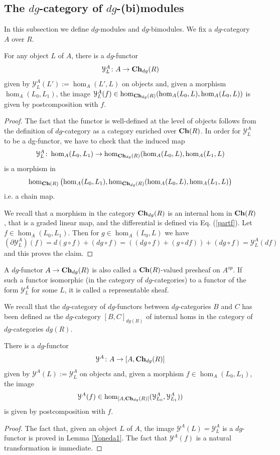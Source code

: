 \subsection{The $dg$-category of $dg$-(bi)modules}

In this subsection we define $dg$-modules and $dg$-bimodules.
We fix a $dg$-category $A$ over $R$.
\begin{lem}\label{Yoneda1}
    For any object $L$ of $A$, there is a $dg$-functor $$\mathcal{Y}^A_L\colon A\to \mathbf{Ch}_{dg}(R)$$ given by $\mathcal{Y}^A_L(L'):=\hom_A(L',L)$ on objects and, given a morphism $\hom_A(L_0,L_1)$, the image $\mathcal{Y}^A_L(f)\in \hom_{\mathbf{Ch}_{dg}(R)}(\hom_A(L_0,L), \hom_A(L_0,L))$ is given by postcomposition with $f$.
\end{lem}
\begin{proof}
    The fact that the functor is well-defined at the level of objects follows from the definition of $dg$-category as a category enriched over $\mathbf{Ch}(R)$. In order for $\mathcal{Y}^A_L$ to be a dg-functor, we have to check that the induced map $$\mathcal{Y}^A_L\colon \hom_A(L_0,L_1)\to \hom_{\mathbf{Ch}_{dg}(R)}(\hom_A(L_0,L), \hom_A(L_1,L)$$ is a morphism in $$\hom_{\mathbf{Ch}(R)}\left(\hom_A(L_0,L_1),\hom_{\mathbf{Ch}_{dg}(R)}(\hom_A(L_0,L), \hom_A(L_1,L)\right)$$ i.e. a chain map. 
    
    We recall that a morphism in the category $\mathbf{Ch}_{dg}(R)$ is an internal hom in $\mathbf{Ch}(R)$, that is a graded linear map, and the differential is defined via Eq. (\ref{partf}).
    Let $f\in \hom_A(L_0,L_1)$. Then for $g\in \hom_A(L_0,L)$ we have $$ (\partial\mathcal{Y}^A_L)(f) = d(g\circ f) + (dg\circ f) = \left((dg\circ f) + (g\circ df) \right)+(dg\circ f) = \mathcal{Y}^A_L(df)$$ and this proves the claim.
\end{proof}
\begin{remark}
    A $dg$-functor $A\to \mathbf{Ch}_{dg}(R)$ is also called a $\mathbf{Ch}(R)$-valued presheaf on $A^{op}$. If such a functor isomorphic (in the category of $dg$-categories) to a functor of the form $\mathcal{Y}^A_L$ for some $L$, it is called a representable sheaf.
\end{remark}
We recall that the $dg$-category of $dg$-functors between $dg$-categories $B$ and $C$ has been defined as the $dg$-category $[B,C]_{dg(R)}$ of internal homs in the category of $dg$-categories $dg(R)$.

\begin{lem}
    There is a $dg$-functor $$\mathcal{Y}^A\colon A\to [A,\mathbf{Ch}_{dg}(R)]$$ given by $\mathcal{Y}^A(L):=\mathcal{Y}^A_L$ on objects and, given a morphism $f\in \hom_A(L_0,L_1)$, the image $$\mathcal{Y}^A(f)\in \hom_{[A,\mathbf{Ch}_{dg}(R)]}(\mathcal{Y}^A_{L_0},\mathcal{Y}^A_{L_1}))$$ is given by postcomposition with $f$.
\end{lem}
\begin{proof}
    The fact that, given an object $L$ of $A$, the image $\mathcal{Y}^A(L)=\mathcal{Y}^A_L$ is a $dg$-functor is proved in Lemma \ref{Yoneda1}. The fact that $\mathcal{Y}^A(f)$ is a natural transformation is immediate.
\end{proof}

